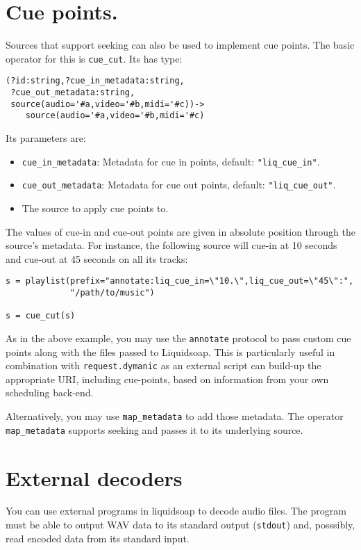 \section{Cue points.}
Sources that support seeking can also be used to implement cue points.
The basic operator for this is \verb+cue_cut+. Its has type:

\begin{verbatim}
(?id:string,?cue_in_metadata:string,
 ?cue_out_metadata:string,
 source(audio='#a,video='#b,midi='#c))->
    source(audio='#a,video='#b,midi='#c)
\end{verbatim}
Its parameters are:

\begin{itemize}
\item \verb+cue_in_metadata+: Metadata for cue in points, default: \verb+"liq_cue_in"+.
\item \verb+cue_out_metadata+: Metadata for cue out points, default: \verb+"liq_cue_out"+.
\item The source to apply cue points to.

\end{itemize}
The values of cue-in and cue-out points are given in absolute
position through the source's metadata. For instance, the following
source will cue-in at 10 seconds and cue-out at 45 seconds on all its tracks:

\begin{verbatim}
s = playlist(prefix="annotate:liq_cue_in=\"10.\",liq_cue_out=\"45\":",
             "/path/to/music")

s = cue_cut(s)
\end{verbatim}
As in the above example, you may use the \verb+annotate+ protocol to pass custom cue
points along with the files passed to Liquidsoap. This is particularly useful 
in combination with \verb+request.dymanic+ as an external script can build-up
the appropriate URI, including cue-points, based on information from your
own scheduling back-end.

Alternatively, you may use \verb+map_metadata+ to add those metadata. The operator
\verb+map_metadata+ supports seeking and passes it to its underlying source.


\section{External decoders}
You can use external programs in liquidsoap to decode audio files. The program must be able to
output WAV data to its standard output (\verb+stdout+) and, posssibly, read encoded data from its 
standard input.

